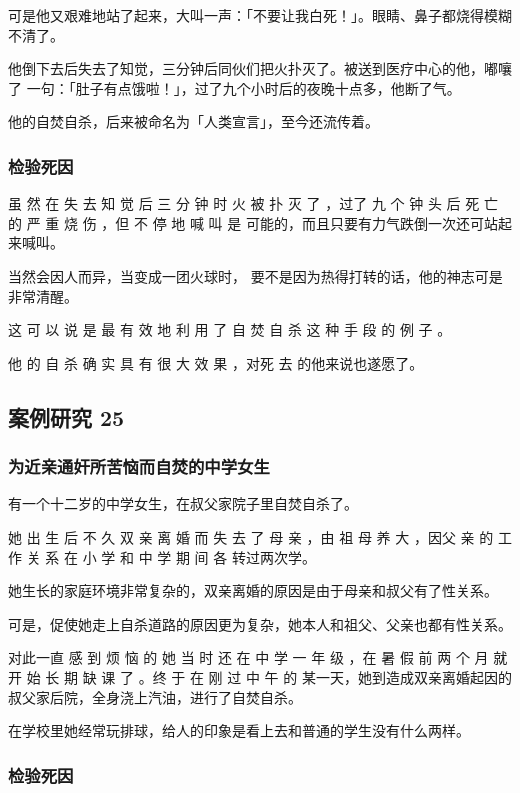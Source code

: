 \documentclass[UTF8]{ctexart}
\begin{document}
可是他又艰难地站了起来，大叫一声：「不要让我白死！」。眼睛、鼻子都烧得模糊不清了。

他倒下去后失去了知觉，三分钟后同伙们把火扑灭了。被送到医疗中心的他，嘟嚷了 一句：「肚子有点饿啦！」，过了九个小时后的夜晚十点多，他断了气。

他的自焚自杀，后来被命名为「人类宣言」，至今还流传着。

\subsubsection*{检验死因}

虽 然 在 失 去 知 觉 后 三 分 钟 时 火 被 扑 灭 了 ，过了 九 个 钟 头 后 死 亡 的 严 重 烧 伤 ，但 不 停 地 喊 叫 是 可能的，而且只要有力气跌倒一次还可站起来喊叫。

当然会因人而异，当变成一团火球时， 要不是因为热得打转的话，他的神志可是非常清醒。 

这 可 以 说 是 最 有 效 地 利 用 了 自 焚 自 杀 这 种 手 段 的 例 子 。

他 的 自 杀 确 实 具 有 很 大 效 果 ，对死 去 的他来说也遂愿了。

\subsection{案例研究 25}

\subsubsection*{为近亲通奸所苦恼而自焚的中学女生}

有一个十二岁的中学女生，在叔父家院子里自焚自杀了。

她 出 生 后 不 久 双 亲 离 婚 而 失 去 了 母 亲 ，由 祖 母 养 大 ，因父 亲 的 工 作 关 系 在 小 学 和 中 学 期 间 各 转过两次学。

她生长的家庭环境非常复杂的，双亲离婚的原因是由于母亲和叔父有了性关系。
 
可是，促使她走上自杀道路的原因更为复杂，她本人和祖父、父亲也都有性关系。

对此一直 感 到 烦 恼 的 她 当 时 还 在 中 学 一 年 级 ，在 暑 假 前 两 个 月 就 开 始 长 期 缺 课 了 。终 于 在 刚 过 中 午 的 某一天，她到造成双亲离婚起因的叔父家后院，全身浇上汽油，进行了自焚自杀。

在学校里她经常玩排球，给人的印象是看上去和普通的学生没有什么两样。

\subsubsection*{检验死因}
\end{document}

